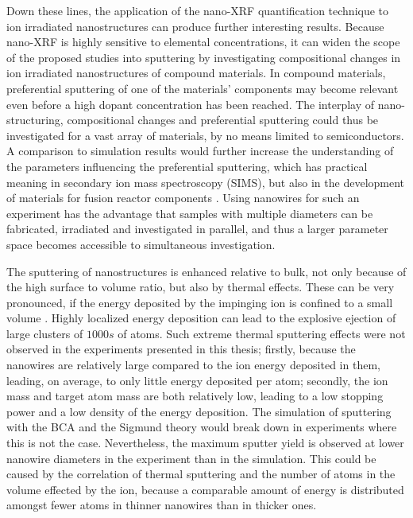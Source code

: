 Down these lines, the application of the nano-XRF quantification technique to ion irradiated nanostructures can produce further interesting results. Because nano-XRF is highly sensitive to elemental concentrations, it can widen the scope of the proposed studies into sputtering by investigating compositional changes in ion irradiated nanostructures of compound materials. In compound materials, preferential sputtering of one of the materials' components may become relevant even before a high dopant concentration has been reached. The interplay of nano-structuring, compositional changes and preferential sputtering could thus be investigated for a vast array of materials, by no means limited to semiconductors. A comparison to simulation results would further increase the understanding of the parameters influencing the preferential sputtering, which has practical meaning in secondary ion mass spectroscopy (SIMS), but also in the development of materials for fusion reactor components \cite{kelly_attempt_1978,roth_sputtering_1990,kenmotsu_effect_2011}. Using nanowires for such an experiment has the advantage that samples with multiple diameters can be fabricated, irradiated and investigated in parallel, and thus a larger parameter space becomes accessible to simultaneous investigation.

The sputtering of nanostructures is enhanced relative to bulk, not only because of the high surface to volume ratio, but also by thermal effects. These can be very pronounced, if the energy deposited by the impinging ion is confined to a small volume \cite{greaves_enhanced_2013,ilinov_sputtering_2014,nietiadi_sputtering_2014,anders_sputtering_2015,urbassek_sputter_2015}. Highly localized energy deposition can lead to the explosive ejection of large clusters of $1000s$ of atoms. Such extreme thermal sputtering effects were not observed in the experiments presented in this thesis; firstly, because the nanowires are relatively large compared to the ion energy deposited in them, leading, on average, to only little energy deposited per atom; secondly, the ion mass and target atom mass are both relatively low, leading to a low stopping power and a low density of the energy deposition. The simulation of sputtering with the BCA and the Sigmund theory would break down in experiments where this is not the case. Nevertheless, the maximum sputter yield is observed at lower nanowire diameters in the experiment than in the simulation. This could be caused by the correlation of thermal sputtering and the number of atoms in the volume effected by the ion, because a comparable amount of energy is distributed amongst fewer atoms in thinner nanowires than in thicker ones.

